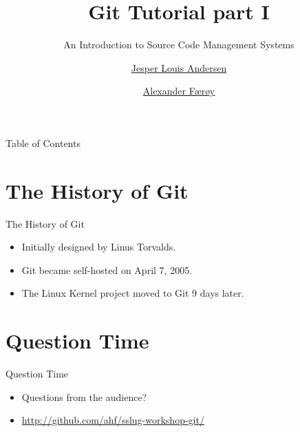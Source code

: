 \documentclass[xcolor=pdftex,dvipsnames]{beamer}
\title{Git Tutorial part I}
\subtitle{An Introduction to Source Code Management Systems}
\author{\href{mailto:jesper.louis.andersen@gmail.com}{Jesper Louis Andersen}
        \and
        \href{mailto:ahf@0x90.dk}{Alexander Færøy}}
\begin{document}
\frame{\titlepage}

\begin{frame}{Table of Contents}
    \tableofcontents
\end{frame}

\section{The History of Git}
\begin{frame}{The History of Git}
    \begin{itemize}
        \item Initially designed by Linus Torvalds.
        \item Git became self-hosted on April 7, 2005.
        \item The Linux Kernel project moved to Git 9 days later.
    \end{itemize}
\end{frame}

\section{Question Time}
\begin{frame}{Question Time}
    \begin{itemize}
        \item Questions from the audience?
        \item \url{http://github.com/ahf/sslug-workshop-git/}
    \end{itemize}
\end{frame}
\end{document}
